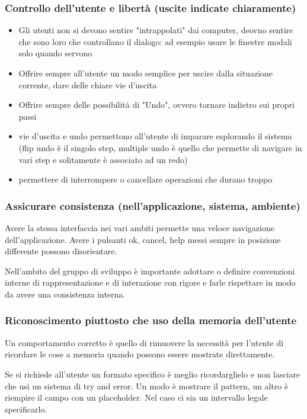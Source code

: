 \documentclass[11pt,a4paper]{book}
\begin{document}
\subsubsection{Controllo dell'utente e libertà (uscite indicate chiaramente)}
\begin{itemize}
	\item Gli utenti non si devono sentire "intrappolati" dai computer, deovno sentire che sono loro che controllano il dialogo: ad esempio usare le finestre modali solo quando servono
	\item Offrire sempre all'utente un modo semplice per uscire dalla situazione corrente, dare delle chiare vie d'uscita
	\item Offrire sempre delle possibilità di "Undo", ovvero tornare indietro sui propri passi
	\item vie d'uscita e undo permettono all'utente di imparare esplorando il sistema (flip undo è il singolo step, multiple undo è quello che permette di navigare in vari step e solitamente è associato ad un redo)
	\item permettere di interrompere o cancellare operazioni che durano troppo
\end{itemize}

\subsubsection{Assicurare consistenza (nell'applicazione, sistema, ambiente)}
Avere la stessa interfaccia nei vari ambiti permette una veloce navigazione dell'applicazione. Avere i pulsanti ok, cancel, help messi sempre in posizione differente possono disorientare.

Nell'ambito del gruppo di sviluppo è importante adottare o definire convenzioni interne di rappresentazione e di interazione con rigore e farle rispettare in modo da avere una consistenza interna.

\subsubsection{Riconoscimento piuttosto che uso della memoria dell'utente}
Un comportamento corretto è quello di rimuovere la necessità per l'utente di ricordare le cose a memoria quando possono essere mostrate direttamente.

Se si richiede all'utente un formato specifico è meglio ricordarglielo e non lasciare che usi un sistema di try and error. Un modo è mostrare il pattern, un altro è riempire il campo con un placeholder. Nel caso ci sia un intervallo legale specificarlo.
\end{document}
